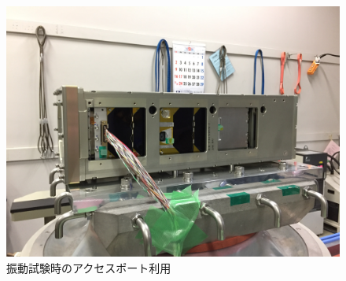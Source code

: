 \begin{figure}[h]
	\begin{center}
		
		\includegraphics[width=0.6\linewidth]{04/fig/accessport.JPG}
		\caption{振動試験時のアクセスポート利用}
		\label{fig:accessport}
		
	\end{center}
\end{figure}